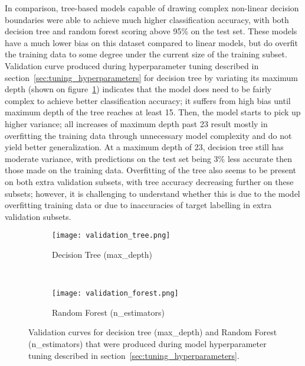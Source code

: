 In comparison, tree-based models capable of drawing complex non-linear decision boundaries were able to achieve much higher classification accuracy, with both decision tree and random forest scoring above 95\% on the test set.
These models have a much lower bias on this dataset compared to linear models, but do overfit the training data to some degree under the current size of the training subset.
Validation curve produced during hyperparameter tuning described in section~\ref{sec:tuning_hyperparameters} for decision tree by variating its maximum depth (shown on figure~\ref{fig:validation_tree}) indicates that the model does need to be fairly complex to achieve better classification accuracy;
it suffers from high bias until maximum depth of the tree reaches at least 15.
Then, the model starts to pick up higher variance;
all increases of maximum depth past 23 result mostly in overfitting the training data through unnecessary model complexity and do not yield better generalization.
At a maximum depth of 23, decision tree still has moderate variance, with predictions on the test set being 3\% less accurate then those made on the training data.
Overfitting of the tree also seems to be present on both extra validation subsets, with tree accuracy decreasing further on these subsets;
however, it is challenging to understand whether this is due to the model overfitting training data or due to inaccuracies of target labelling in extra validation subsets.

\begin{figure}[hbt!]
    \centering
    \begin{subfigure}[t]{.47\textwidth}
        \centering
        \texttt{[image: validation\_tree.png]}
        \caption{Decision Tree (max\_depth)}
        \label{fig:validation_tree}
    \end{subfigure}
    ~ %
    \begin{subfigure}[t]{.48\textwidth}
        \centering
        \texttt{[image: validation\_forest.png]}
        \caption{Random Forest (n\_estimators)}
        \label{fig:validation_forest}
    \end{subfigure}
    \caption{Validation curves for decision tree (max\_depth) and Random Forest (n\_estimators) that were produced during model hyperparameter tuning described in section~\ref{sec:tuning_hyperparameters}.}
    \label{fig:validation_curves}
\end{figure}

